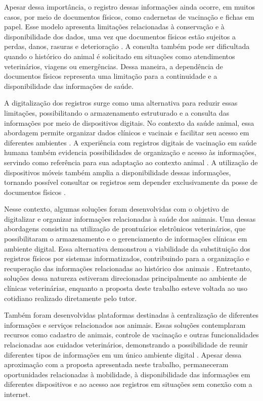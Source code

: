 \documentclass{UNESC}
\begin{document}
Apesar dessa importância, o registro dessas informações ainda ocorre, em muitos casos, por meio de documentos físicos, como cadernetas de vacinação e fichas em papel. Esse modelo apresenta limitações relacionadas à conservação e à disponibilidade dos dados, uma vez que documentos físicos estão sujeitos a perdas, danos, rasuras e deterioração \cite{BOLSON2022}. A consulta também pode ser dificultada quando o histórico do animal é solicitado em situações como atendimentos veterinários, viagens ou emergências. Dessa maneira, a dependência de documentos físicos representa uma limitação para a continuidade e a disponibilidade das informações de saúde.

A digitalização dos registros surge como uma alternativa para reduzir essas limitações, possibilitando o armazenamento estruturado e a consulta das informações por meio de dispositivos digitais. No contexto da saúde animal, essa abordagem permite organizar dados clínicos e vacinais e facilitar seu acesso em diferentes ambientes \cite{VIEIRA2020}. A experiência com registros digitais de vacinação em saúde humana também evidencia possibilidades de organização e acesso às informações, servindo como referência para sua adaptação ao contexto animal \cite{MARTINS2024}. A utilização de dispositivos móveis também amplia a disponibilidade dessas informações, tornando possível consultar os registros sem depender exclusivamente da posse de documentos físicos \cite{RODRIGUES2022}.

Nesse contexto, algumas soluções foram desenvolvidas com o objetivo de digitalizar e organizar informações relacionadas à saúde dos animais. Uma dessas abordagens consistiu na utilização de prontuários eletrônicos veterinários, que possibilitaram o armazenamento e o gerenciamento de informações clínicas em ambiente digital. Essa alternativa demonstrou a viabilidade da substituição dos registros físicos por sistemas informatizados, contribuindo para a organização e recuperação das informações relacionadas ao histórico dos animais \cite{iskandar2023}. Entretanto, soluções dessa natureza estiveram direcionadas principalmente ao ambiente de clínicas veterinárias, enquanto a proposta deste trabalho esteve voltada ao uso cotidiano realizado diretamente pelo tutor.

Também foram desenvolvidas plataformas destinadas à centralização de diferentes informações e serviços relacionados aos animais. Essas soluções contemplaram recursos como cadastro de animais, controle de vacinação e outras funcionalidades relacionadas aos cuidados veterinários, demonstrando a possibilidade de reunir diferentes tipos de informações em um único ambiente digital \cite{vieira2025}. Apesar dessa aproximação com a proposta apresentada neste trabalho, permaneceram oportunidades relacionadas à mobilidade, à disponibilidade das informações em diferentes dispositivos e ao acesso aos registros em situações sem conexão com a internet.
\end{document}
